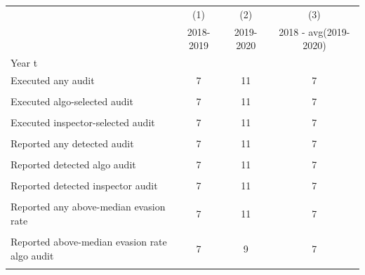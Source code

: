 {
\def\sym#1{\ifmmode^{#1}\else\(^{#1}\)\fi}
\begin{tabular}{l*{3}{c}}
\toprule
            &\multicolumn{1}{c}{(1)}&\multicolumn{1}{c}{(2)}&\multicolumn{1}{c}{(3)}\\
            &\multicolumn{1}{c}{2018-2019}&\multicolumn{1}{c}{2019-2020}&\multicolumn{1}{c}{2018 - avg(2019-2020)}\\
\midrule
Year t      &                     &                     &                     \\
Executed any audit&           7         &          11         &           7         \\
            &                     &                     &                     \\
Executed algo-selected audit&           7         &          11         &           7         \\
            &                     &                     &                     \\
Executed inspector-selected audit&           7         &          11         &           7         \\
            &                     &                     &                     \\
Reported any detected audit&           7         &          11         &           7         \\
            &                     &                     &                     \\
Reported detected algo audit&           7         &          11         &           7         \\
            &                     &                     &                     \\
Reported detected inspector audit&           7         &          11         &           7         \\
            &                     &                     &                     \\
Reported any above-median evasion rate&           7         &          11         &           7         \\
            &                     &                     &                     \\
Reported above-median evasion rate algo audit&           7         &           9         &           7         \\
            &                     &                     &                     \\

\end{tabular}}
